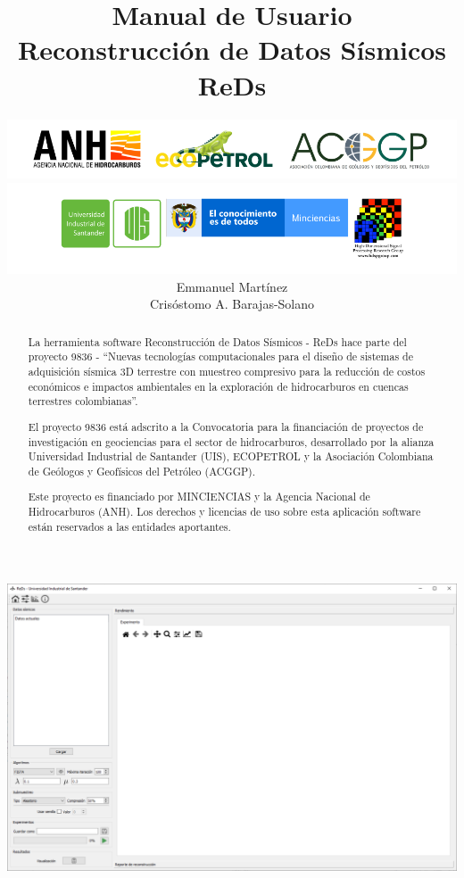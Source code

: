 \documentclass[12pt,twoside,letter]{ol-softwaremanual}
\title{\large{Manual de Usuario}\\ \vspace{10mm} \huge{Reconstrucción de Datos Sísmicos}\\ \vspace{5mm} \huge{ReDs}}
\author{\includegraphics[width=14cm]{figures/upper_logo.png} \\ \includegraphics[width=14cm]{figures/lower_logo.png} \\ Emmanuel Martínez \\ Crisóstomo A. Barajas-Solano}
\begin{document}
\maketitle

\newpage\null\thispagestyle{empty}\newpage

\begin{center}
\includegraphics[width=.9\linewidth]{header.png}
\end{center}
\begin{abstract}
La herramienta software Reconstrucción de Datos Sísmicos - ReDs hace parte del proyecto 9836 - ``Nuevas tecnologías computacionales para el diseño de sistemas de adquisición sísmica 3D terrestre con muestreo compresivo para la reducción de costos económicos e impactos ambientales en la exploración de hidrocarburos en cuencas terrestres colombianas''.

El proyecto 9836 está adscrito a la Convocatoria para la financiación de proyectos de investigación en geociencias para el sector de hidrocarburos, desarrollado por la alianza Universidad Industrial de Santander (UIS), ECOPETROL y la Asociación Colombiana de Geólogos y Geofísicos del Petróleo (ACGGP). 

Este proyecto es financiado por MINCIENCIAS y la Agencia Nacional de Hidrocarburos (ANH). Los derechos y licencias de uso sobre esta aplicación software están reservados a las entidades aportantes.
\end{abstract}
\end{document}
